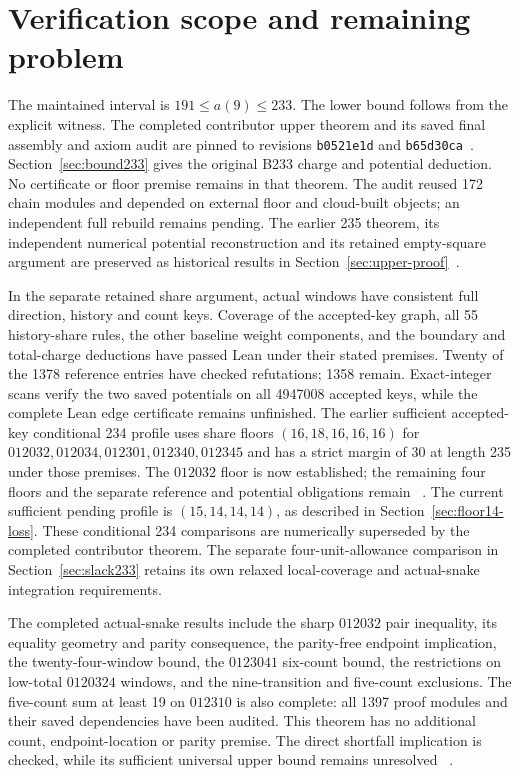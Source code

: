 \documentclass[11pt,a4paper]{article}
\theoremstyle{definition}
\theoremstyle{remark}
\begin{document}
\section{Verification scope and remaining problem}\label{sec:verification}
The maintained interval is $191\le a(9)\le233$. The lower bound follows
from the explicit witness. The completed contributor upper theorem and
its saved final assembly and axiom audit are pinned to revisions
\texttt{b0521e1d} and \texttt{b65d30ca}~\cite{bound233archive}.
Section~\ref{sec:bound233} gives the original B233 charge and potential
deduction. No certificate or floor premise remains in that theorem.
The audit reused 172 chain modules and depended on external floor and
cloud-built objects; an independent full rebuild remains pending.
The earlier 235 theorem, its independent numerical potential reconstruction
and its retained empty-square argument are preserved as historical results
in Section~\ref{sec:upper-proof}~\cite{bound235archive}.

In the separate retained share argument, actual windows have consistent full direction,
history and count keys. Coverage of the accepted-key graph, all 55
history-share rules, the other baseline weight components, and the boundary
and total-charge deductions have passed Lean under their stated premises.
Twenty of the 1378 reference entries have checked refutations; 1358 remain.
Exact-integer scans verify the two saved potentials on all 4947008 accepted
keys, while the complete Lean edge certificate remains unfinished.
The earlier sufficient accepted-key conditional 234 profile uses share floors
$(16,18,16,16,16)$ for $012032,012034,012301,012340,012345$ and has a
strict margin of 30 at length 235 under those premises. The $012032$
floor is now established; the remaining four floors and the separate
reference and potential obligations remain
~\cite{referenceunionarchive,potentialcertificatearchive,share152archive}.
The current sufficient pending profile is $(15,14,14,14)$, as described in
Section~\ref{sec:floor14-loss}. These conditional 234 comparisons are
numerically superseded by the completed contributor theorem. The separate
four-unit-allowance comparison in Section~\ref{sec:slack233} retains its
own relaxed local-coverage and actual-snake integration requirements.

The completed actual-snake results include the sharp $012032$ pair
inequality, its equality geometry and parity consequence, the parity-free
endpoint implication, the twenty-four-window bound, the $0123041$
six-count bound, the restrictions on low-total $0120324$ windows, and the
nine-transition and five-count exclusions. The five-count sum at least 19
on $012310$ is also complete: all 1397 proof modules and their saved
dependencies have been audited. This theorem has no additional count,
endpoint-location or parity premise. The direct shortfall implication is
checked, while its sufficient universal upper bound remains unresolved
~\cite{count24archive,fivecount140archive,share145archive}.
\end{document}
